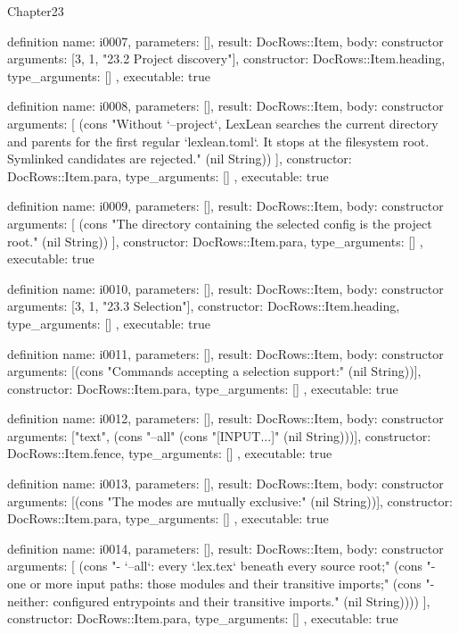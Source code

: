 \begin{lexlean}{Chapter23}
\begin{semanticmodule}
definition{
  name: i0007,
  parameters: [],
  result: DocRows::Item,
  body: constructor{
    arguments: [3, 1, "23.2 Project discovery"],
    constructor: DocRows::Item.heading,
    type_arguments: []
  },
  executable: true
}

definition{
  name: i0008,
  parameters: [],
  result: DocRows::Item,
  body: constructor{
    arguments: [
      (cons "Without `--project`, LexLean searches the current directory and parents for the first regular `lexlean.toml`. It stops at the filesystem root. Symlinked candidates are rejected." (nil String))
    ],
    constructor: DocRows::Item.para,
    type_arguments: []
  },
  executable: true
}

definition{
  name: i0009,
  parameters: [],
  result: DocRows::Item,
  body: constructor{
    arguments: [
      (cons "The directory containing the selected config is the project root." (nil String))
    ],
    constructor: DocRows::Item.para,
    type_arguments: []
  },
  executable: true
}

definition{
  name: i0010,
  parameters: [],
  result: DocRows::Item,
  body: constructor{
    arguments: [3, 1, "23.3 Selection"],
    constructor: DocRows::Item.heading,
    type_arguments: []
  },
  executable: true
}

definition{
  name: i0011,
  parameters: [],
  result: DocRows::Item,
  body: constructor{
    arguments: [(cons "Commands accepting a selection support:" (nil String))],
    constructor: DocRows::Item.para,
    type_arguments: []
  },
  executable: true
}

definition{
  name: i0012,
  parameters: [],
  result: DocRows::Item,
  body: constructor{
    arguments: ["text", (cons "--all" (cons "[INPUT...]" (nil String)))],
    constructor: DocRows::Item.fence,
    type_arguments: []
  },
  executable: true
}

definition{
  name: i0013,
  parameters: [],
  result: DocRows::Item,
  body: constructor{
    arguments: [(cons "The modes are mutually exclusive:" (nil String))],
    constructor: DocRows::Item.para,
    type_arguments: []
  },
  executable: true
}

definition{
  name: i0014,
  parameters: [],
  result: DocRows::Item,
  body: constructor{
    arguments: [
      (cons "- `--all`: every `.lex.tex` beneath every source root;" (cons "- one or more input paths: those modules and their transitive imports;" (cons "- neither: configured entrypoints and their transitive imports." (nil String))))
    ],
    constructor: DocRows::Item.para,
    type_arguments: []
  },
  executable: true
}


\end{semanticmodule}
\end{lexlean}
